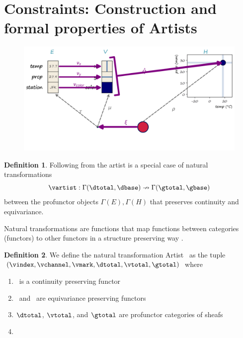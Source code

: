 \documentclass[10pt,journal,compsoc]{IEEEtran}
\theoremstyle{definition}
\newtheorem{definition}{Definition}[section]
\theoremstyle{remark}
\begin{document}
\section{Constraints: Construction and formal properties of Artists}
\label{sec:artist:construction}
\begin{figure}[h!]
  \includegraphics[width=\linewidth]{q.png}
  \caption{}
  \label{fig:constraints:q-overall}
\end{figure}


\begin{definition} Following from \label{def:artist:} the artist \vartist is a special case of  natural transformations
  \begin{equation}
    \vartist: \Gamma(\dtotal, \dbase)\nrightarrow \Gamma(\gtotal, \gbase)
  \end{equation}
  between the profunctor objects $\Gamma(E),\Gamma(H)$ that preserves continuity and equivariance.
\end{definition}
  Natural transformations are functions that map functions between categories (functors) to other functors in a structure preserving way \cite{riehlCategoryTheoryContext, spanier1989algebraic, fongInvitationAppliedCategory2019}.

\begin{definition} We define the natural transformation \textcolor{artist}{Artist}  \vartist\ as the tuple $(\vindex, \vchannel, \vmark, \mathcal{\dtotal},\mathcal{\vtotal}, \mathcal{\gtotal})$ where
  \begin{enumerate}
    \item \vindex\ is a continuity preserving functor
    \item \vchannel\ and \vmark\ are equivariance preserving functors
    \item $\mathcal{\dtotal}$, $\mathcal{\vtotal}$, and $\mathcal{\gtotal}$ are profunctor categories of sheafs
    \item 
  \end{enumerate}
\end{definition}
\end{document}
